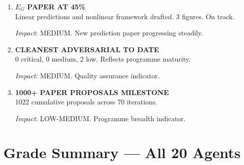 \documentclass[11pt,a4paper]{article}
\begin{document}
\begin{enumerate}[label=\textbf{\arabic*.}, leftmargin=1.5cm]
\textit{Impact}: MEDIUM-HIGH. External validation timeline confirmed.

\item \textbf{$E_G$ PAPER AT 45\%}\\
Linear predictions and nonlinear framework drafted. 3 figures. On track.

\textit{Impact}: MEDIUM. New prediction paper progressing steadily.

\item \textbf{CLEANEST ADVERSARIAL TO DATE}\\
0 critical, 0 medium, 2 low. Reflects programme maturity.

\textit{Impact}: MEDIUM. Quality assurance indicator.

\item \textbf{1000+ PAPER PROPOSALS MILESTONE}\\
1022 cumulative proposals across 70 iterations.

\textit{Impact}: LOW-MEDIUM. Programme breadth indicator.

\end{enumerate}


\section{Grade Summary --- All 20 Agents}
\label{sec:grades}
\end{document}
